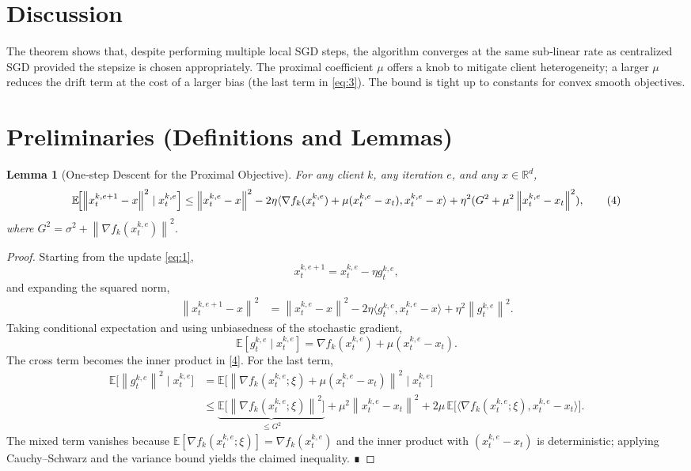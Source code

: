 \documentclass[11pt]{article}
\newtheorem{lemma}{Lemma}
\newcommand{\E}{\mathbb{E}}
\newcommand{\R}{\mathbb{R}}
\newcommand{\norm}[1]{\left\|#1\right\|}
\newcommand{\inner}[2]{\langle #1,#2\rangle}
\begin{document}
\section*{Discussion}
The theorem shows that, despite performing multiple local SGD steps, the algorithm converges at the same sub‑linear rate as centralized SGD provided the stepsize is chosen appropriately.  The proximal coefficient $\mu$ offers a knob to mitigate client heterogeneity; a larger $\mu$ reduces the drift term at the cost of a larger bias (the last term in \eqref{eq:3}).  The bound is tight up to constants for convex smooth objectives.

\newpage
\section*{Preliminaries (Definitions and Lemmas)}
\begin{lemma}[One‑step Descent for the Proximal Objective]\label{lem:one_step}
For any client $k$, any iteration $e$, and any $x\in\R^{d}$,
\[
    \E\!\Bigl[\norm{x_{t}^{k,e+1}-x}^{2}\mid x_{t}^{k,e}\Bigr]
    \le
    \norm{x_{t}^{k,e}-x}^{2}
    -2\eta\inner{\nabla f_k(x_{t}^{k,e})+\mu(x_{t}^{k,e}-x_t)}{x_{t}^{k,e}-x}
    +\eta^{2}(G^{2}+\mu^{2}\norm{x_{t}^{k,e}-x_t}^{2}),
\tag{4}
\]
where $G^{2}= \sigma^{2}+ \norm{\nabla f_k(x_{t}^{k,e})}^{2}$.
\end{lemma}
\begin{proof}
Starting from the update \eqref{eq:1},
\[
    x_{t}^{k,e+1}=x_{t}^{k,e}-\eta g_{t}^{k,e},
\]
and expanding the squared norm,
\[
\begin{aligned}
    \norm{x_{t}^{k,e+1}-x}^{2}
    &=\norm{x_{t}^{k,e}-x}^{2}
      -2\eta\inner{g_{t}^{k,e}}{x_{t}^{k,e}-x}
      +\eta^{2}\norm{g_{t}^{k,e}}^{2}.
\end{aligned}
\tag{5}
\]
Taking conditional expectation and using unbiasedness of the stochastic gradient,
\[
    \E[g_{t}^{k,e}\mid x_{t}^{k,e}]
        =\nabla f_k(x_{t}^{k,e})+\mu(x_{t}^{k,e}-x_t).
\tag{6}
\]
The cross term becomes the inner product in \eqref{4}.  For the last term,
\[
\begin{aligned}
    \E\!\bigl[\norm{g_{t}^{k,e}}^{2}\mid x_{t}^{k,e}\bigr]
    &=\E\!\bigl[\norm{\nabla f_k(x_{t}^{k,e};\xi)+\mu(x_{t}^{k,e}-x_t)}^{2}\mid x_{t}^{k,e}\bigr]\\
    &\le \underbrace{\E\!\bigl[\norm{\nabla f_k(x_{t}^{k,e};\xi)}^{2}\bigr]}_{\le G^{2}}
       +\mu^{2}\norm{x_{t}^{k,e}-x_t}^{2}
       +2\mu\,\E\!\bigl[\inner{\nabla f_k(x_{t}^{k,e};\xi)}{x_{t}^{k,e}-x_t}\bigr].
\end{aligned}
\tag{7}
\]
The mixed term vanishes because $\E[\nabla f_k(x_{t}^{k,e};\xi)]=\nabla f_k(x_{t}^{k,e})$ and the inner product with $(x_{t}^{k,e}-x_t)$ is deterministic; applying Cauchy–Schwarz and the variance bound yields the claimed inequality.  ∎
\end{proof}
\end{document}
